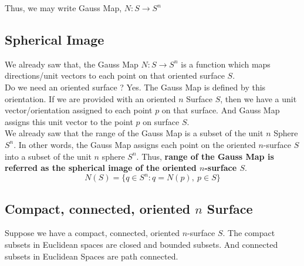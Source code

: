 	Thus, we may write Gauss Map, $N : S \to S^n$
\subsection{Spherical Image}
	We already saw that, the Gauss Map $N : S \to S^n$ is a function which maps directions/unit vectors to each point on that oriented surface $S$.\\

	Do we need an oriented surface ? Yes.
	The Gauss Map is defined by this orientation.
	If we are provided with an oriented $n$ Surface $S$, then we have a unit vector/orientation assigned to each point $p$ on that surface.
	And Gauss Map assigns this unit vector to the point $p$ on surface $S$.\\

	We already saw that the range of the Gauss Map is a subset of the unit $n$ Sphere $S^n$.
	In other words, the Gauss Map assigns each point on the oriented $n$-surface $S$ into a subset of the unit $n$ sphere $S^n$.
	Thus, \textbf{range of the Gauss Map is referred as the spherical image of the oriented $n$-surface $S$}.
	\begin{equation}
	N(S) = \{ q \in S^n : q = N(p),\ p \in S \}
	\end{equation}

\subsection{Compact, connected, oriented $n$ Surface}
	Suppose we have a compact, connected, oriented $n$-surface $S$.
	The compact subsets in Euclidean spaces are closed and bounded subsets.
	And connected subsets in Euclidean Spaces are path connected.\\

